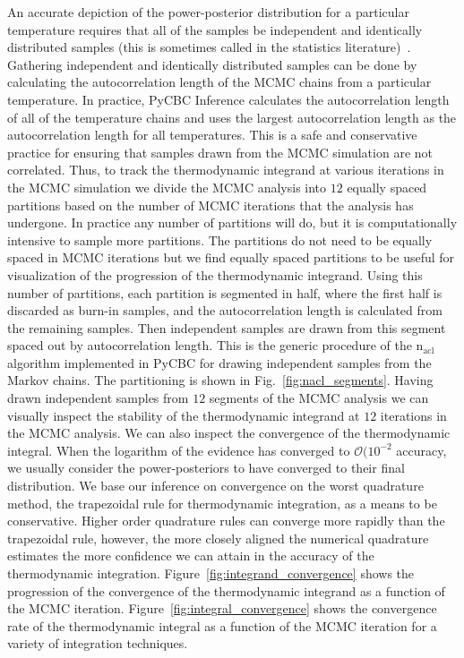 An accurate depiction of the power-posterior distribution for a particular temperature requires that all of the samples be independent and identically distributed samples (this is sometimes called  in the statistics literature)~\cite{annis2019thermodynamic}. Gathering independent and identically distributed samples can be done by calculating the autocorrelation length of the MCMC chains from a particular temperature. In practice, PyCBC Inference calculates the autocorrelation length of all of the temperature chains and uses the largest autocorrelation length as the autocorrelation length for all temperatures. This is a safe and conservative practice for ensuring that samples drawn from the MCMC simulation are not correlated. Thus, to track the thermodynamic integrand at various iterations in the MCMC simulation we divide the MCMC analysis into $12$ equally spaced partitions  based on the number of MCMC iterations that the analysis has undergone. In practice any number of partitions will do, but it is computationally intensive to sample more partitions. The partitions do not need to be equally spaced in MCMC iterations but we find equally spaced partitions to be useful for visualization of the progression of the thermodynamic integrand. Using this number of partitions, each partition is segmented in half, where the first half is discarded as burn-in samples, and the autocorrelation length is calculated from the remaining samples. Then independent samples are drawn from this segment spaced out by autocorrelation length. This is the generic procedure of the $\mathrm{n_{acl}}$ algorithm implemented in PyCBC for drawing independent samples from the Markov chains. The partitioning is shown in Fig.~\ref{fig:nacl_segments}. Having drawn independent samples from $12$ segments of the MCMC analysis we can visually inspect the stability of the thermodynamic integrand at $12$ iterations in the MCMC analysis. We can also inspect the convergence of the thermodynamic integral. When the logarithm of the evidence has converged to $\mathcal{O}(10^{-2}$ accuracy, we usually consider the power-posteriors to have converged to their final distribution. We base our inference on convergence on the worst quadrature method, the trapezoidal rule for thermodynamic integration, as a means to be conservative. Higher order quadrature rules can converge more rapidly than the trapezoidal rule, however, the more closely aligned the numerical quadrature estimates the more confidence we can attain in the accuracy of the thermodynamic integration. Figure~\ref{fig:integrand_convergence} shows the progression of the convergence of the thermodynamic integrand as a function of the MCMC iteration. Figure~\ref{fig:integral_convergence} shows the convergence rate of the thermodynamic integral as a function of the MCMC iteration for a variety of integration techniques.

